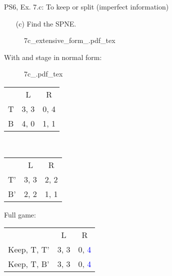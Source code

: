 \begin{frame}{PS6, Ex. 7.c: To keep or split (imperfect information)}
    \begin{itemize}
      \item[(c)] Find the SPNE.
    \end{itemize}
    \vspace{-16pt}
    \begin{figure}[!h]
      \center
      \def\svgwidth{.8\columnwidth}
      {7c_extensive_form_.pdf_tex}
    \end{figure}
    \vspace{-8pt}
    \begin{multicols}{2}
      With  and  stage in normal form:
      \vspace{-4pt}
      \begin{figure}[!h]
        \center
        \def\svgwidth{.5\columnwidth}
        {7c_.pdf_tex}
      \end{figure}
      \vspace{-9pt}
      \begin{table}
        \begin{tabular}{l|c|c|}
          \multicolumn{1}{c}{} & \multicolumn{1}{c}{L} & \multicolumn{1}{c}{R} \\\cline{2-3}
          T & 3, 3 & 0, 4 \\\cline{2-3}
          B & 4, 0 & 1, 1 \\\cline{2-3}
        \end{tabular}\
        \begin{tabular}{l|c|c|}
          \multicolumn{1}{c}{} & \multicolumn{1}{c}{L} & \multicolumn{1}{c}{R} \\\cline{2-3}
          T' & 3, 3 & 2, 2 \\\cline{2-3}
          B' & 2, 2 & 1, 1 \\\cline{2-3}
        \end{tabular}
      \end{table}
    \vfill\null \columnbreak
    Full game:
    \vspace{-16pt}
    \begin{table}
      \begin{tabular}{l|c|c|}
        \multicolumn{1}{c}{} & \multicolumn{1}{c}{L} & \multicolumn{1}{c}{R} \\\cline{2-3}
        Keep, T, T' & 3, 3 & 0, \textcolor{blue}{4} \\\cline{2-3}
        Keep, T, B' & 3, 3 & 0, \textcolor{blue}{4} \\\cline{2-3}

\end{tabular}
\end{table}
\end{multicols}
\end{frame}
